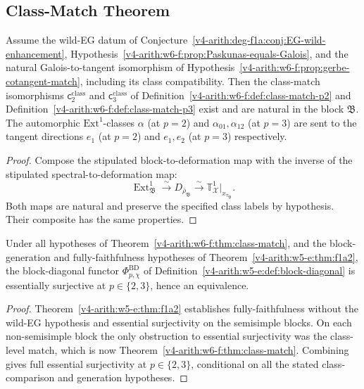 \subsection{Class-Match Theorem}

\begin{theorem}
\label{v4-arith:w6-f:thm:class-match}
Assume the wild-EG datum of
Conjecture~\ref{v4-arith:deg-f1a:conj:EG-wild-enhancement},
Hypothesis~\ref{v4-arith:w6-f:prop:Paskunas-equals-Galois}, and
the natural Galois-to-tangent isomorphism of
Hypothesis~\ref{v4-arith:w6-f:prop:gerbe-cotangent-match},
including its class compatibility. Then the class-match
isomorphisms \(\mathsf{c}^{\mathrm{class}}_{2}\) and
\(\mathsf{c}^{\mathrm{class}}_{3}\) of
Definition~\ref{v4-arith:w6-f:def:class-match-p2} and
Definition~\ref{v4-arith:w6-f:def:class-match-p3} exist and are natural in the
block \(\mathfrak{B}\). The automorphic \(\mathrm{Ext}^{1}\)-classes
\(\alpha\) (at \(p=2\)) and \(\alpha_{01},\alpha_{12}\) (at \(p=3\)) are sent
to the tangent directions \(e_{1}\) (at \(p=2\)) and \(e_{1},e_{2}\)
(at \(p=3\)) respectively.
\end{theorem}

\begin{proof}
Compose the stipulated block-to-deformation map with the inverse
of the stipulated spectral-to-deformation map:
\[
 \operatorname{Ext}^1_{\mathfrak B}
 \xrightarrow{\sim}D_{\bar\rho_{\mathfrak B}}
 \xrightarrow{\sim}\mathbb T^1_{\mathcal X}|_{x_{\tau_{\mathfrak B}}}.
\]
Both maps are natural and preserve the specified class labels by
hypothesis. Their composite has the same properties.
\end{proof}

\begin{corollary}[F1.a.2 full essential surjectivity at \(p=2,3\)]
\label{v4-arith:w6-f:cor:f1a2-surjectivity}
Under all hypotheses of
Theorem~\ref{v4-arith:w6-f:thm:class-match}, and the block-generation
and fully-faithfulness hypotheses of
Theorem~\ref{v4-arith:w5-e:thm:f1a2}, the block-diagonal
functor \(\Phi^{\mathrm{BD}}_{p,\chi}\) of
Definition~\ref{v4-arith:w5-e:def:block-diagonal} is essentially surjective
at \(p\in\{2,3\}\), hence an equivalence.
\end{corollary}

\begin{proof}
Theorem~\ref{v4-arith:w5-e:thm:f1a2} establishes fully-faithfulness
without the wild-EG hypothesis and essential surjectivity on the
semisimple blocks.
On each non-semisimple block the only obstruction to essential
surjectivity was the class-level match, which is now
Theorem~\ref{v4-arith:w6-f:thm:class-match}. Combining gives full essential
surjectivity at \(p\in\{2,3\}\), conditional on all the stated class-comparison and generation
hypotheses.
\end{proof}

